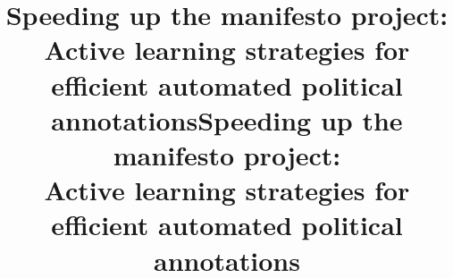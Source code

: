 \documentclass[runningheads,a4paper]{article}
\begin{document}

\title{Speeding up the manifesto project: Active learning strategies for efficient automated political annotations}

\title{Speeding up the manifesto project: \\ Active learning strategies for \\efficient automated political annotations}

%
%
\author{
}
%


%
%

\maketitle
\end{document}
